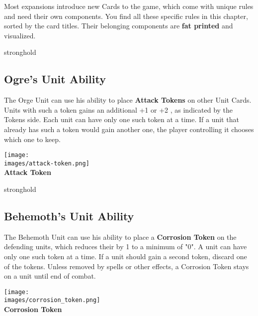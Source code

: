 

Most expansions introduce new Cards to the game, which come with unique rules and need their own components.  You find all these specific rules in this chapter, sorted by the card titles. Their belonging components are \textbf{fat printed} and visualized.

\begin{multicols*}{2}

\begin{expansion}{stronghold}
	\subsection*{Ogre's Unit Ability}
	The Orge Unit can use his  ability to place \textbf{Attack Tokens} on other Unit Cards.
  Units with such a token gains an additional +1  or +2 , as indicated by the Tokens side.
  Each unit can have only one such token at a time.
  If a unit that already has such a token would gain another one, the player controlling it chooses which one to keep.
  \bigskip
  \begin{center}
    \hspace{2pt}\texttt{[image: \\images/attack-token.png]}\\
    \vspace*{-3pt}
    \textbf{\scriptsize\color{darkcandyapplered}Attack Token}
  \end{center}
\end{expansion}
\vspace*{1em}

\begin{expansion}{stronghold}
	\subsection*{Behemoth's Unit Ability}
	The Behemoth Unit can use his  ability to place a \textbf{Corrosion Token} on the defending units, which reduces their  by 1 to a minimum of "0". A unit can have only one such token at a time.
	If a unit should gain a second token, discard one of the tokens. Unless removed by spells or other effects, a Corrosion Token stays on a unit until end of combat.

  \bigskip
  \begin{center}
    \texttt{[image: \\images/corrosion\_token.png]}\\
    \vspace*{-3pt}
    \textbf{\scriptsize\color{darkcandyapplered}Corrosion Token}
  \end{center}
\end{expansion}
\vspace*{1em}


\end{multicols*}
